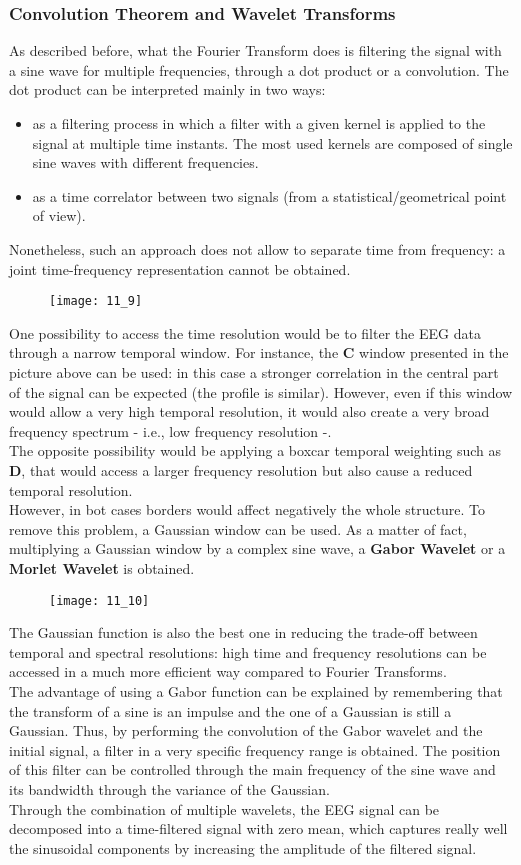 \subsubsection{Convolution Theorem and Wavelet Transforms}
As described before, what the Fourier Transform does is filtering the signal with a sine wave for multiple
frequencies, through a dot product or a convolution. The dot product can be interpreted mainly in two ways:
\begin{itemize}
    \item as a filtering process in which a filter with a given kernel is applied to the signal at multiple
          time instants. The most used kernels are composed of single sine waves with different frequencies.
    \item as a time correlator between two signals (from a statistical/geometrical point of view).
\end{itemize}
Nonetheless, such an approach does not allow to separate time from frequency: a joint time-frequency
representation cannot be obtained.
\begin{figure}[H]
    \texttt{[image: 11\_9]}
    \centering
\end{figure}
One possibility to access the time resolution would be to filter the EEG data through a narrow temporal window.
For instance, the \textbf{C} window presented in the picture above can be used: in this case a stronger
correlation in the central part of the signal can be expected (the profile is similar). However, even if this
window would allow a very high temporal resolution, it would also create a very broad frequency spectrum - i.e.,
low frequency resolution -.\\
The opposite possibility would be applying a boxcar temporal weighting such as \textbf{D}, that would access a
larger frequency resolution but also cause a reduced temporal resolution.\\
However, in bot cases borders would affect negatively the whole structure. To remove this problem, a Gaussian
window can be used. As a matter of fact, multiplying a Gaussian window by a complex sine wave, a 
\textbf{Gabor Wavelet} or a \textbf{Morlet Wavelet} is obtained.
\begin{figure}[H]
    \texttt{[image: 11\_10]}
    \centering
\end{figure}
The Gaussian function is also the best one in reducing the trade-off between
temporal and spectral resolutions: high time and frequency resolutions can be accessed in a much more efficient
way compared to Fourier Transforms.\\
The advantage of using a Gabor function can be explained by remembering that the transform of a sine is an
impulse and the one of a Gaussian is still a Gaussian. Thus, by performing the convolution of the Gabor wavelet
and the initial signal, a filter in a very specific frequency range is obtained. The position of this filter
can be controlled through the main frequency of the sine wave and its bandwidth through the variance of the Gaussian.\\
Through the combination of multiple wavelets, the EEG signal can be decomposed into a time-filtered signal
with zero mean, which captures really well the sinusoidal components by increasing the amplitude of the filtered
signal.
